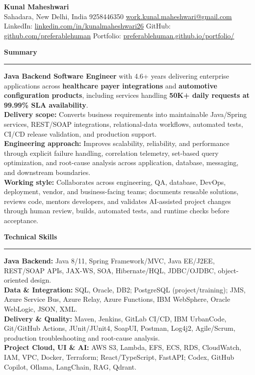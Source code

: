 \documentclass[11pt,letterpaper]{article}
\newcommand{\ressection}[1]{\Needspace{6\baselineskip}\vspace{8pt}\par\textbf{#1}\par\vspace{2pt}\hrule\vspace{5pt}}
\begin{document}
\pagestyle{empty}\raggedright\fontsize{11}{12.5}\selectfont

{\Large \textbf{Kunal Maheshwari}}\\
Sahadara, New Delhi, India \textbar{} 9258446350 \textbar{} \href{mailto:work.kunal.maheshwari@gmail.com}{work.kunal.maheshwari@gmail.com}\\
LinkedIn: \href{https://www.linkedin.com/in/kunalmaheshwari26}{linkedin.com/in/kunalmaheshwari26} \textbar{} GitHub: \href{https://github.com/preferablehuman}{github.com/preferablehuman} \textbar{} Portfolio: \href{https://preferablehuman.github.io/portfolio/}{preferablehuman.github.io/portfolio/}

\ressection{Summary}
\textbf{Java Backend Software Engineer} with 4.6+ years delivering enterprise applications across \textbf{healthcare payer integrations} and \textbf{automotive configuration products}, including services handling \textbf{50K+ daily requests at 99.99\% SLA availability}.\\[2pt]
\textbf{Delivery scope:} Converts business requirements into maintainable Java/Spring services, REST/SOAP integrations, relational-data workflows, automated tests, CI/CD release validation, and production support.\\[2pt]
\textbf{Engineering approach:} Improves scalability, reliability, and performance through explicit failure handling, correlation telemetry, set-based query optimization, and root-cause analysis across application, database, messaging, and downstream boundaries.\\[2pt]
\textbf{Working style:} Collaborates across engineering, QA, database, DevOps, deployment, vendor, and business-facing teams; documents reusable solutions, reviews code, mentors developers, and validates AI-assisted project changes through human review, builds, automated tests, and runtime checks before acceptance.

\ressection{Technical Skills}
\textbf{Java Backend:} Java 8/11, Spring Framework/MVC, Java EE/J2EE, REST/SOAP APIs, JAX-WS, SOA, Hibernate/HQL, JDBC/OJDBC, object-oriented design.\\
\textbf{Data \& Integration:} SQL, Oracle, DB2; PostgreSQL (project/training); JMS, Azure Service Bus, Azure Relay, Azure Functions, IBM WebSphere, Oracle WebLogic, JSON, XML.\\
\textbf{Delivery \& Quality:} Maven, Jenkins, GitLab CI/CD, IBM UrbanCode, Git/GitHub Actions, JUnit/JUnit4, SoapUI, Postman, Log4j2, Agile/Scrum, production troubleshooting and root-cause analysis.\\
\textbf{Project Cloud, UI \& AI:} AWS S3, Lambda, EFS, ECS, RDS, CloudWatch, IAM, VPC, Docker, Terraform; React/TypeScript, FastAPI; Codex, GitHub Copilot, Ollama, LangChain, RAG, Qdrant.
\end{document}
